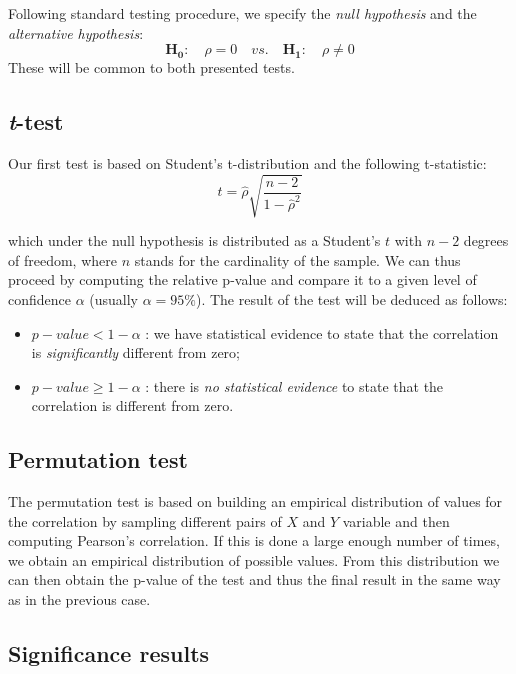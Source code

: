 Following standard testing procedure, we specify the \textit{null hypothesis} and the \textit{alternative hypothesis}:
\begin{equation*}
	\mathbf{H_{0}}: \quad \rho = 0 \quad vs. \quad	\mathbf{H_{1}}: \quad \rho \neq 0
\end{equation*}
These will be common to both presented tests.

\subsection{\textit{t}-test}
Our first test is based on Student's t-distribution and the following t-statistic:
\begin{equation}
	t = \hat{\rho} \sqrt{\frac{n - 2}{1 - \hat{\rho}^2}}
\end{equation} 

which under the null hypothesis is distributed as a Student's $t$ with $n-2$ degrees of freedom, where $n$ stands for the cardinality of the sample.
We can thus proceed by computing the relative p-value and compare it to a given level of confidence $\alpha$ (usually $\alpha = 95\%$). 
The result of the test will be deduced as follows:
\begin{itemize}
	\item $p-value < 1 - \alpha$ : we have statistical evidence to state that the correlation is \textit{significantly} different from zero;
	\item $p-value \geq 1 - \alpha$ : there is \textit{no statistical evidence} to state that the correlation is different from zero.
\end{itemize}


\subsection{Permutation test}
 The permutation test is based on building an empirical distribution of values for the correlation by sampling different pairs of $X$ and $Y$ variable and then computing Pearson's correlation. If this is done a large enough number of times, we obtain an empirical distribution of possible values. 
 From this distribution we can then obtain the p-value of the test and thus the final result in the same way as in the previous case.
 

\subsection{Significance results}
 
